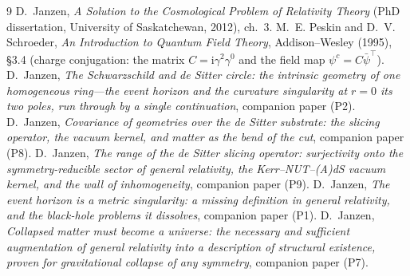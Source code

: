 \documentclass[11pt]{article}
\theoremstyle{plain}
\theoremstyle{remark}
\begin{document}
\begin{thebibliography}{9}
 D.~Janzen, \emph{A Solution to the Cosmological
Problem of Relativity Theory} (PhD dissertation, University of Saskatchewan,
2012), ch.~3.
 M.~E. Peskin and D.~V. Schroeder, \emph{An Introduction to Quantum Field Theory}, Addison--Wesley (1995), \S3.4 (charge conjugation: the matrix $C=\mathrm{i}\gamma^{2}\gamma^{0}$ and the field map $\psi^{c}=C\bar\psi^{\top}$).
 D.~Janzen,
\emph{The Schwarzschild and de Sitter circle: the intrinsic geometry of one homogeneous ring---the event horizon and the curvature singularity at $r=0$ its two poles, run through by a single continuation}, companion paper (P2).
 D.~Janzen, \emph{Covariance of geometries over the de Sitter substrate: the slicing operator, the vacuum kernel, and matter as the bend of the cut}, companion paper (P8).
 D.~Janzen, \emph{The range of the de Sitter slicing operator: surjectivity onto the symmetry-reducible sector of general relativity, the Kerr--NUT--(A)dS vacuum kernel, and the wall of inhomogeneity}, companion paper (P9).
 D.~Janzen, \emph{The event horizon is a metric singularity: a missing definition in general relativity, and the black-hole problems it dissolves}, companion paper (P1).
 D.~Janzen, \emph{Collapsed matter must become a universe: the necessary and sufficient augmentation of general relativity into a description of structural existence, proven for gravitational collapse of any symmetry}, companion paper (P7).


\end{thebibliography}
\end{document}
